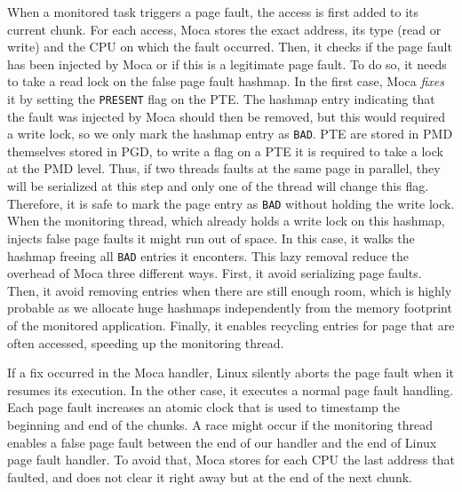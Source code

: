 When a monitored task triggers a page fault, the access is first added to its current chunk.
For each access, \gls{Moca} stores the exact address, its type (read or write) and the CPU on which the fault occurred.
Then, it checks if the page fault has been injected by \gls{Moca} or if this is a legitimate page fault.
To do so, it needs to take a read lock on the false page fault hashmap.
In the first case, \gls{Moca} \emph{fixes} it by setting the \texttt{PRESENT} flag on the \gls{PTE}.
The hashmap entry indicating that the fault was injected by \gls{Moca} should then be removed, but this would required a write lock, so we only mark the hashmap entry as \texttt{BAD}.
\gls{PTE} are stored in \gls{PMD} themselves stored in \gls{PGD}, to write a flag on a \gls{PTE} it is required to take a lock at the \gls{PMD} level.
Thus, if two threads faults at the same page in parallel, they will be serialized at this step and only one of the thread will change this flag.
Therefore, it is safe to mark the page entry as \texttt{BAD} without holding the write lock.
When the monitoring thread, which already holds a write lock on this hashmap, injects false page faults it might run out of space.
In this case, it walks the hashmap freeing all \texttt{BAD} entries it enconters.
This lazy removal reduce the overhead of \gls{Moca} three different ways.
First, it avoid serializing page faults.
Then, it avoid removing entries when there are still enough room, which is highly probable as we allocate huge hashmaps independently from the memory footprint of the monitored application.
Finally, it enables recycling entries for page that are often accessed, speeding up the monitoring thread.

If a fix occurred in the \gls{Moca} handler, Linux silently aborts the page fault when it resumes its execution.
In the other case, it executes a normal page fault handling.
Each page fault increases an atomic clock that is used to timestamp the beginning and end of the chunks.
A race might occur if the monitoring thread enables a false page fault between the end of our handler and the end of Linux page fault handler.
To avoid that, \gls{Moca} stores for each CPU the last address that faulted, and does not clear it right away but at the end of the next chunk.


